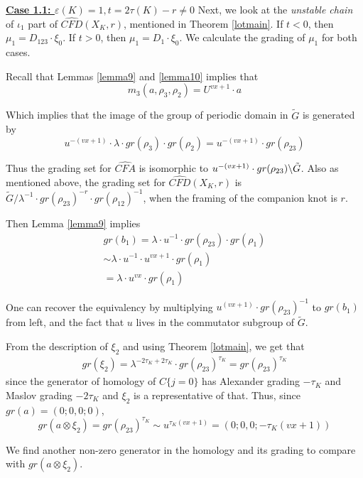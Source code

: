 \documentclass[11pt,reqno]{amsart}
\theoremstyle{definition}
\newtheorem *{remark}{Remark}
\newcommand{\cfahat}{\widehat{\mathit{CFA}}}
\newcommand{\cfdhat}{\widehat{\mathit{CFD}}}
\begin{document}
\begin{subsection}{\underline{\textbf{Case 1.1: $\varepsilon(K)=1, t = 2 \tau(K) - r \neq 0$}}}
 Next, we look at the \emph{unstable chain} of $\iota_1$ part of $\cfdhat(X_K,r)$, mentioned in Theorem \ref{lotmain}. If $t < 0$, then $ \mu_1 = D_{123} \cdot \xi_0$. If $ t > 0$, then $\mu_1 = D_1 \cdot \xi_0$. We calculate the grading of $\mu_1$ for both cases.



Recall that Lemmas \ref{lemma9} and \ref{lemma10} implies that \[ m_3(a, \rho_3,\rho_2) = U^{vx+1} \cdot a \]

Which implies that the image of the group of periodic domain in $\tilde{G}$ is generated by 
\[u^{-(vx+1)} \cdot \lambda \cdot gr(\rho_3) \cdot gr(\rho_2) = u^{-(vx+1)}\cdot gr(\rho_{23})\]


Thus the grading set for $\cfahat$ is isomorphic to  $u^{-(vx+1)} \cdot gr(\rho_{23}) \symbol{92} \Tilde{G}$.
Also as mentioned above, the grading set for $\cfdhat(X_K,r)$ is  $\tilde{G} / \lambda^{-1}\cdot gr(\rho_{23})^{-r} \cdot gr(\rho_{12})^{-1}$, when the framing of the companion knot is $r$.

Then Lemma \ref{lemma9} implies
\begin{align*}
    gr(b_1) = \lambda \cdot u^{-1} \cdot gr(\rho_{23}) \cdot gr (\rho_1) \\
    \sim \lambda \cdot u^{-1} \cdot u^{vx+1} \cdot gr(\rho_1) \\
    = \lambda \cdot u^{vx} \cdot gr(\rho_1)
\end{align*} 

One can recover the equivalency by multiplying $u^{(vx+1)} \cdot gr(\rho_{23})^{-1}$ to $gr(b_1)$ from left, and the fact that $u$ lives in the commutator subgroup of $\tilde{G}$.

From the description of $\xi_2$ and using Theorem \ref{lotmain}, we get that \begin{align*}
    gr(\xi_2) = \lambda^{-2\tau_K + 2\tau_K} \cdot gr(\rho_{23})^{\tau_K} = gr(\rho_{23})^{\tau_K}
\end{align*} 
since the generator of homology of $C\{j=0\}$ has Alexander grading $-\tau_K$ and Maslov grading $-2\tau_K$ and $\xi_2$ is a representative of that.
Thus, since $gr(a) = (0;0,0;0)$, 
\begin{equation}
\label{eq3}
    gr(a \otimes \xi_2) = gr(\rho_{23})^{\tau_K} \sim u^{\tau_K(vx+1)} = (0;0,0;-\tau_K(vx+1))
\end{equation}


We find another non-zero generator in the homology and its grading to compare with $gr(a\otimes \xi_2)$.  



\end{subsection}
\end{document}
